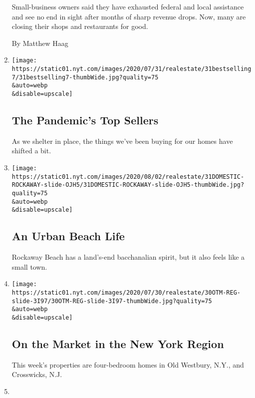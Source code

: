 \begin{enumerate}
  Small-business owners said they have exhausted federal and local
  assistance and see no end in sight after months of sharp revenue
  drops. Now, many are closing their shops and restaurants for good.

  By Matthew Haag
\item
  \href{/slideshow/2020/07/31/realestate/the-pandemics-top-sellers.html}{}

  \texttt{[image: https://static01.nyt.com/images/2020/07/31/realestate/31bestselling7/31bestselling7-thumbWide.jpg?quality=75\\\&auto=webp\\\&disable=upscale]}

  \hypertarget{the-pandemics-top-sellers}{%
  \subsection{The Pandemic's Top
  Sellers}\label{the-pandemics-top-sellers}}

  As we shelter in place, the things we've been buying for our homes
  have shifted a bit.
\item
  \href{/slideshow/2020/07/31/realestate/an-urban-beach-life.html}{}

  \texttt{[image: https://static01.nyt.com/images/2020/08/02/realestate/31DOMESTIC-ROCKAWAY-slide-OJH5/31DOMESTIC-ROCKAWAY-slide-OJH5-thumbWide.jpg?quality=75\\\&auto=webp\\\&disable=upscale]}

  \hypertarget{an-urban-beach-life}{%
  \subsection{An Urban Beach Life}\label{an-urban-beach-life}}

  Rockaway Beach has a land's-end bacchanalian spirit, but it also feels
  like a small town.
\item
  \href{/slideshow/2020/07/30/realestate/on-the-market-in-the-new-york-region.html}{}

  \texttt{[image: https://static01.nyt.com/images/2020/07/30/realestate/30OTM-REG-slide-3I97/30OTM-REG-slide-3I97-thumbWide.jpg?quality=75\\\&auto=webp\\\&disable=upscale]}

  \hypertarget{on-the-market-in-the-new-york-region}{%
  \subsection{On the Market in the New York
  Region}\label{on-the-market-in-the-new-york-region}}

  This week's properties are four-bedroom homes in Old Westbury, N.Y.,
  and Crosswicks, N.J.
\item
  \href{/slideshow/2020/07/30/realestate/on-the-market-in-new-york-city.html}{}


\end{enumerate}

